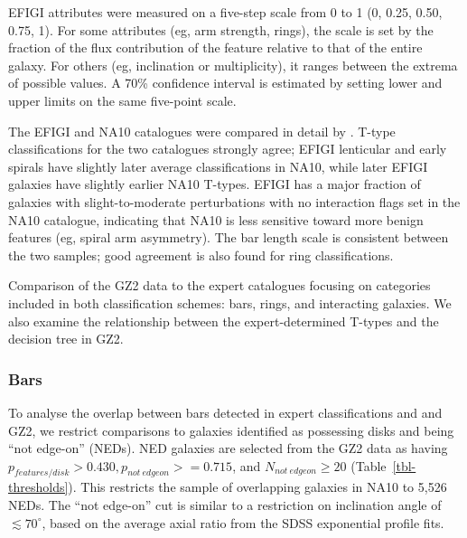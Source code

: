 \documentclass[useAMS,usenatbib]{mn2e}
\begin{document}
\noindent EFIGI attributes were measured on a five-step scale from 0 to 1 (0, 0.25, 0.50, 0.75, 1). For some attributes (eg, arm strength, rings), the scale is set by the fraction of the flux contribution of the feature relative to that of the entire galaxy. For others (eg, inclination or multiplicity), it ranges between the extrema of possible values. A 70\% confidence interval is estimated by setting lower and upper limits on the same five-point scale.

The EFIGI and NA10 catalogues were compared in detail by \citet{bai11}. T-type classifications for the two catalogues strongly agree; EFIGI lenticular and early spirals have slightly later average classifications in NA10, while later EFIGI galaxies have slightly earlier NA10 T-types. EFIGI has a major fraction of galaxies with slight-to-moderate perturbations with no interaction flags set in the NA10 catalogue, indicating that NA10 is less sensitive toward more benign features (eg, spiral arm asymmetry). The bar length scale is consistent between the two samples; good agreement is also found for ring classifications. 


Comparison of the GZ2 data to the expert catalogues focusing on categories included in both classification schemes: bars, rings, and interacting galaxies. We also examine the relationship between the expert-determined T-types and the decision tree in GZ2.

\subsubsection{Bars}

To analyse the overlap between bars detected in expert classifications and and GZ2, we restrict comparisons to galaxies identified as possessing disks and being ``not edge-on'' (NEDs). NED galaxies are selected from the GZ2 data as having $p_{features/disk}>0.430, p_{not~edgeon}>=0.715$, and $N_{not~edgeon}\geq20$ (Table~\ref{tbl-thresholds}). This restricts the sample of overlapping galaxies in NA10 to 5,526 NEDs. The ``not edge-on'' cut is similar to a restriction on inclination angle of $\lesssim70^\circ$, based on the average axial ratio from the SDSS exponential profile fits.
\end{document}
